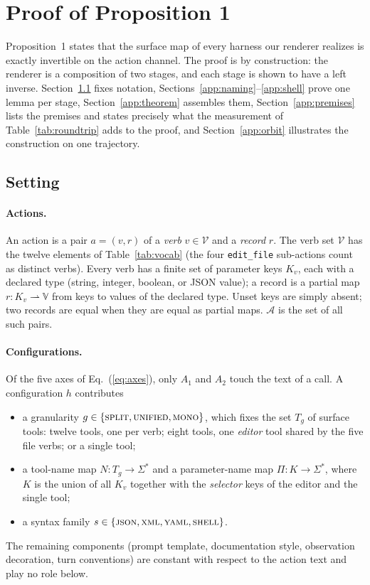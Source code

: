 \documentclass{article} %
\begin{document}



\appendix
\section{Proof of Proposition 1}
\label{app:proof}

Proposition~1 states that the surface map of every harness our renderer
realizes is exactly invertible on the action channel. The proof is by
construction: the renderer is a composition of two stages, and each stage is
shown to have a left inverse. Section~\ref{app:setting} fixes notation,
Sections~\ref{app:naming}--\ref{app:shell} prove one lemma per stage,
Section~\ref{app:theorem} assembles them, Section~\ref{app:premises}
lists the premises and states precisely what the measurement of
Table~\ref{tab:roundtrip} adds to the proof, and Section~\ref{app:orbit}
illustrates the construction on one trajectory.

\subsection{Setting}
\label{app:setting}

\paragraph{Actions.} An action is a pair $a=(v,r)$ of a \emph{verb}
$v\in\mathcal{V}$ and a \emph{record} $r$. The verb set $\mathcal{V}$ has the
twelve elements of Table~\ref{tab:vocab} (the four \texttt{edit\_file}
sub-actions count as distinct verbs). Every verb has a finite set of parameter
keys $K_v$, each with a declared type (string, integer, boolean, or JSON
value); a record is a partial map $r:K_v\rightharpoonup \mathbb{V}$ from keys to
values of the declared type. Unset keys are simply absent; two records are
equal when they are equal as partial maps. $\mathcal{A}$ is the set of all such
pairs.

\paragraph{Configurations.} Of the five axes of Eq.~(\ref{eq:axes}), only
$A_1$ and $A_2$ touch the text of a call. A configuration $h$ contributes
\begin{itemize}
\item a granularity $g\in\{\textsc{split},\textsc{unified},\textsc{mono}\}$,
      which fixes the set $T_g$ of surface tools: twelve tools, one per verb;
      eight tools, one \emph{editor} tool shared by the five file verbs; or a
      single tool;
\item a tool-name map $N:T_g\to\Sigma^{*}$ and a parameter-name map
      $\Pi:K\to\Sigma^{*}$, where $K$ is the union of all $K_v$ together with
      the \emph{selector} keys of the editor and the single tool;
\item a syntax family $s\in\{\textsc{json},\textsc{xml},\textsc{yaml},
      \textsc{shell}\}$.
\end{itemize}
The remaining components (prompt template, documentation style, observation
decoration, turn conventions) are constant with respect to the action text and
play no role below.
\end{document}
